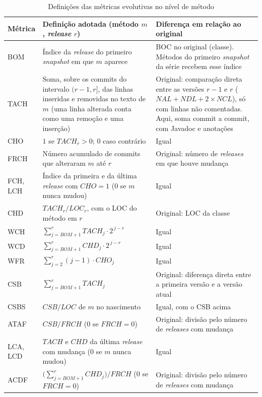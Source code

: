 \begin{table}[htbp]
    \centering
    \footnotesize
    \renewcommand{\arraystretch}{1.25}
    \caption{Definições das métricas evolutivas no nível de método}
    \label{tab:met-evo}
    \begin{tabularx}{\linewidth}{@{}l>{\raggedright\arraybackslash}X>{\raggedright\arraybackslash}X@{}}
        \toprule
        Métrica & Definição adotada (método $m$, \textit{release} $r$) & Diferença em relação ao original \\
        \midrule
        BOM & Índice da \textit{release} do primeiro \textit{snapshot} em que $m$ aparece
            & BOC no original (classe). Métodos do primeiro \textit{snapshot} da série recebem esse índice \\
        TACH & Soma, sobre os commits do intervalo $(r-1, r]$, das linhas inseridas e removidas no texto de $m$
              (uma linha alterada conta como uma remoção e uma inserção)
            & Original: comparação direta entre as versões $r-1$ e $r$ ($NAL + NDL + 2 \times NCL$), só com
              linhas não comentadas. Aqui, soma commit a commit, com Javadoc e anotações \\
        CHO & $1$ se $TACH_r > 0$; $0$ caso contrário & Igual \\
        FRCH & Número acumulado de commits que alteraram $m$ até $r$
            & Original: número de \textit{releases} em que houve mudança \\
        FCH, LCH & Índice da primeira e da última \textit{release} com $CHO = 1$ ($0$ se $m$ nunca mudou) & Igual \\
        CHD & $TACH_r / LOC_r$, com o LOC do método em $r$ & Original: LOC da classe \\
        WCH & $\sum_{j=BOM+1}^{r} TACH_j \cdot 2^{\,j-r}$ & Igual \\
        WCD & $\sum_{j=BOM+1}^{r} CHD_j \cdot 2^{\,j-r}$ & Igual \\
        WFR & $\sum_{j=2}^{r} (j-1) \cdot CHO_j$ & Igual \\
        CSB & $\sum_{j=BOM+1}^{r} TACH_j$
            & Original: diferença direta entre a primeira versão e a versão atual \\
        CSBS & $CSB / LOC$ de $m$ no nascimento & Igual, com o CSB acima \\
        ATAF & $CSB / FRCH$ ($0$ se $FRCH = 0$) & Original: divisão pelo número de \textit{releases} com mudança \\
        LCA, LCD & $TACH$ e $CHD$ da última \textit{release} com mudança ($0$ se $m$ nunca mudou) & Igual \\
        ACDF & $\bigl(\sum_{j=BOM+1}^{r} CHD_j\bigr) / FRCH$ ($0$ se $FRCH = 0$)
            & Original: divisão pelo número de \textit{releases} com mudança \\
        \bottomrule
    \end{tabularx}
\end{table}%
